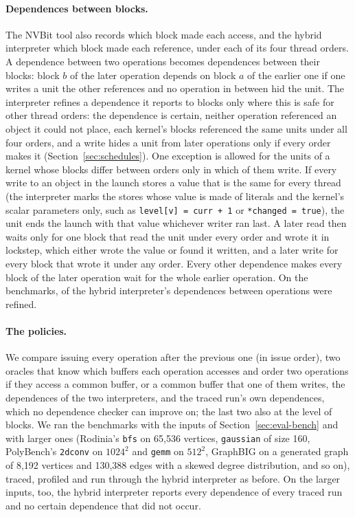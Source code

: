 \documentclass[11pt]{article}
\newcommand{\secref}[1]{Section~\ref{#1}}
\newcommand{\code}[1]{\texttt{#1}}
\begin{document}
\paragraph{Dependences between blocks.} The NVBit tool also records which block made each access, and the
hybrid interpreter which block made each reference, under each of its four thread orders. A dependence between
two operations becomes dependences between their blocks: block $b$ of the later operation depends on block $a$ of
the earlier one if one writes a unit the other references and no operation in between hid the unit. The
interpreter refines a dependence it reports to blocks only where this is safe for other thread orders: the
dependence is certain, neither operation referenced an object it could not place, each kernel's blocks referenced
the same units under all four orders, and a write hides a unit from later operations only if every order makes it
(\secref{sec:schedules}). One exception is allowed for the units of a kernel whose blocks differ between orders
only in which of them write. If every write to an object in the launch stores a value that is the same for every
thread (the interpreter marks the stores whose value is made of literals and the kernel's scalar parameters only,
such as \code{level[v] = curr + 1} or \code{*changed = true}), the unit ends the launch with that value whichever
writer ran last. A later read then waits only for one block that read the unit under every order and wrote it in
lockstep, which either wrote the value or found it written, and a later write for every block that wrote it under
any order. Every other dependence makes every block of the later operation wait for the whole earlier
operation. On the benchmarks, \numSimSmallRefined{} of the hybrid interpreter's dependences between operations were
refined.

\paragraph{The policies.} We compare issuing every operation after the previous one (in issue order), two
oracles that know which buffers each operation accesses and order two operations if they access a common buffer,
or a common buffer that one of them writes, the dependences of the two interpreters, and the traced run's own
dependences, which no dependence checker can improve on; the last two also at the level of blocks. We ran the
benchmarks with the inputs of \secref{sec:eval-bench} and with larger ones (Rodinia's \code{bfs} on 65{,}536
vertices, \code{gaussian} of size 160, PolyBench's \code{2dconv} on $1024^2$ and \code{gemm} on $512^2$, GraphBIG
on a generated graph of 8{,}192 vertices and 130{,}388 edges with a skewed degree distribution, and so on),
traced, profiled and run through the hybrid interpreter as before. On the larger inputs, too, the hybrid
interpreter reports every dependence of every traced run and no certain dependence that did not occur.
\end{document}
